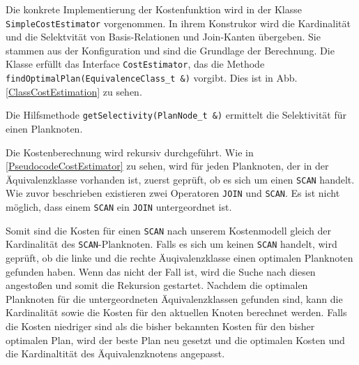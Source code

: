 Die konkrete Implementierung der Kostenfunktion wird in der Klasse \texttt{Simple\-Cost\-Estimator} vorgenommen. In ihrem Konstrukor wird die Kardinalität und die Selektvität von Basis-Relationen und Join-Kanten übergeben. Sie stammen aus der Konfiguration und sind die Grundlage der Berechnung. Die Klasse erfüllt das Interface \texttt{Cost\-Estimator}, das die Methode \texttt{find\-Optimal\-Plan(Equivalence\-Class\_t \&)} vorgibt. Dies ist in Abb. \ref{ClassCostEstimation} zu sehen.

Die Hilfsmethode  \texttt{get\-Selectivity(Plan\-Node\_t \&)} ermittelt die Selektivität für einen Planknoten.


Die Kostenberechnung wird rekursiv durchgeführt. Wie in \ref{PseudocodeCostEstimator} zu sehen, wird für jeden Planknoten, der in der Äquivalenzklasse vorhanden ist, zuerst geprüft, ob es sich um einen \texttt{SCAN} handelt. Wie zuvor beschrieben existieren zwei Operatoren \texttt{JOIN} und \texttt{SCAN}. Es ist nicht möglich, dass einem \texttt{SCAN} ein \texttt{JOIN} untergeordnet ist. 

Somit sind die Kosten für einen \texttt{SCAN} nach unserem Kostenmodell gleich der Kardinalität des \texttt{SCAN}-Planknoten. Falls es sich um keinen \texttt{SCAN} handelt, wird geprüft, ob die linke und die rechte Äuqivalenzklasse einen optimalen Planknoten gefunden haben. Wenn das nicht der Fall ist, wird die Suche nach diesen angestoßen und somit die Rekursion gestartet. Nachdem die optimalen Planknoten für die untergeordneten Äquivalenzklassen gefunden sind, kann die Kardinalität sowie die Kosten für den aktuellen Knoten berechnet werden. Falls die Kosten niedriger sind als die bisher bekannten Kosten für den bisher optimalen Plan, wird der beste Plan neu gesetzt und die optimalen Kosten und die Kardinaltität des Äquivalenzknotens angepasst.



